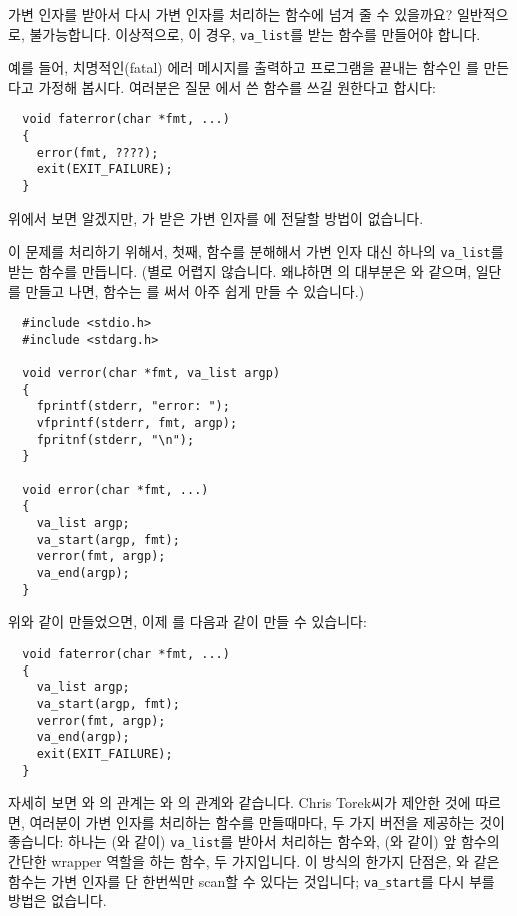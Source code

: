 \begin{faq}
	가변 인자를 받아서 다시 가변 인자를 처리하는 함수에 넘겨 줄 수 있을까요?
\A
	일반적으로, 불가능합니다.  이상적으로, 이 경우, \verb+va_list+를
        받는 함수를 만들어야 합니다.

        예를 들어, 치명적인(fatal) 에러 메시지를 출력하고 프로그램을 끝내는 함수인
        를 만든다고 가정해 봅시다. 여러분은 질문 에서 쓴
         함수를 쓰길 원한다고 합시다:
\begin{verbatim}
  void faterror(char *fmt, ...)
  {
    error(fmt, ????);
    exit(EXIT_FAILURE);
  }
\end{verbatim}
	\noindent 위에서 보면 알겠지만, 가 받은 가변 인자를
        에 전달할 방법이 없습니다.

        이 문제를 처리하기 위해서, 첫째,  함수를 분해해서 가변 인자 대신
        하나의 \verb+va_list+를 받는  함수를 만듭니다.
        (별로 어렵지 않습니다. 왜냐하면 의 대부분은 와 같으며,
        일단 를 만들고 나면,  함수는 를 써서
        아주 쉽게 만들 수 있습니다.)
\begin{verbatim}
  #include <stdio.h>
  #include <stdarg.h>

  void verror(char *fmt, va_list argp)
  {
    fprintf(stderr, "error: ");
    vfprintf(stderr, fmt, argp);
    fpritnf(stderr, "\n");
  }

  void error(char *fmt, ...)
  {
    va_list argp;
    va_start(argp, fmt);
    verror(fmt, argp);
    va_end(argp);
  }
\end{verbatim}
	\noindent 위와 같이 만들었으면, 이제 를 다음과 같이
        만들 수 있습니다:
\begin{verbatim}
  void faterror(char *fmt, ...)
  {
    va_list argp;
    va_start(argp, fmt);
    verror(fmt, argp);
    va_end(argp);
    exit(EXIT_FAILURE);
  }
\end{verbatim}
	자세히 보면 와 의 관계는 와 의
        관계와 같습니다. Chris Torek씨가 제안한 것에 따르면, 여러분이 가변 인자를
        처리하는 함수를 만들때마다, 두 가지 버전을 제공하는 것이 좋습니다: 하나는
        (와 같이) \verb+va_list+를 받아서 처리하는 함수와,
        (와 같이) 앞 함수의 간단한 wrapper 역할을 하는 함수, 두 가지입니다.
        이 방식의 한가지 단점은, 와 같은 함수는 가변 인자를 단 한번씩만
        scan할 수 있다는 것입니다; \verb+va_start+를 다시 부를 방법은 없습니다.


\end{faq}
